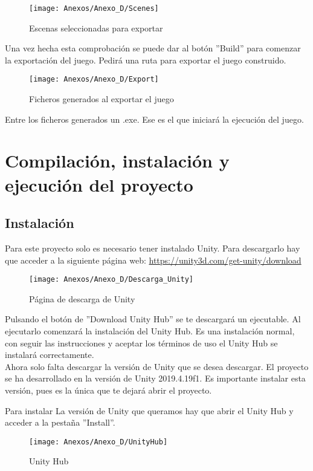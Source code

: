 \begin{figure}[h]
\centering
\texttt{[image: Anexos/Anexo\_D/Scenes]}
\caption{Escenas seleccionadas para exportar}
\end{figure}

Una vez hecha esta comprobación se puede dar al botón ''Build'' para comenzar la exportación del juego. Pedirá una ruta para exportar el juego construido.

\begin{figure}[h]
\centering
\texttt{[image: Anexos/Anexo\_D/Export]}
\caption{Ficheros generados al exportar el juego}
\end{figure}

Entre los ficheros generados un .exe. Ese es el que iniciará la ejecución del juego.

\section{Compilación, instalación y ejecución del proyecto}

\subsection{Instalación}
Para este proyecto solo es necesario tener instalado Unity. Para descargarlo hay que acceder a la siguiente página web: \url{https://unity3d.com/get-unity/download}

\begin{figure}[h]
\centering
\texttt{[image: Anexos/Anexo\_D/Descarga\_Unity]}
\caption{Página de descarga de Unity}
\end{figure}

Pulsando el botón de ''Download Unity Hub'' se te descargará un ejecutable. Al ejecutarlo comenzará la instalación del Unity Hub. Es una instalación normal, con seguir las instrucciones y aceptar los términos de uso el Unity Hub se instalará correctamente.\\
Ahora solo falta descargar la versión de Unity que se desea descargar. El proyecto se ha desarrollado en la versión de Unity 2019.4.19f1. Es importante instalar esta versión, pues es la única que te dejará abrir el proyecto.

Para instalar La versión de Unity que queramos hay que abrir el Unity Hub y acceder a la pestaña ''Install''.

\clearpage
\begin{figure}[h]
\centering
\texttt{[image: Anexos/Anexo\_D/UnityHub]}
\caption{Unity Hub}
\end{figure}

